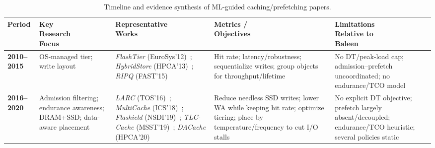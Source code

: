 \begin{table}[ht]
\begin{center}
\captionsetup{type=table}
\caption{Timeline and evidence synthesis of ML-guided caching/prefetching papers.}
\label{tab:bucketA-3periods-full}

\begingroup
\scriptsize
\setlength{\tabcolsep}{1.0pt}
\renewcommand{\arraystretch}{1.0}
\begin{tabularx}{\columnwidth}{
|>{\centering\arraybackslash}p{0.6cm}
|>{\centering\arraybackslash}p{1.5cm}
|>{\centering\arraybackslash}p{2.35cm}
|>{\centering\arraybackslash}p{2.0cm}
|>{\centering\arraybackslash}p{1.6cm}|}
\hline
\textbf{Period} &
\makecell{\textbf{Key}\\[-0pt]\textbf{Research}\\[-0pt]\textbf{Focus}} &
\makecell{\textbf{Representative}\\[-0pt]\textbf{Works}} &
\makecell{\textbf{Metrics /}\\[-0pt]\textbf{Objectives}} &
\makecell{\textbf{Limitations}\\\textbf{Relative to}\\\textbf{ Baleen}}
\\\hline

\textbf{2010--2015} &
OS-managed tier; write layout &
\textit{FlashTier} (EuroSys'12)~\cite{saxena2012flashtier}; 
\textit{HybridStore} (HPCA'13)~\cite{hybridstore2013}; 
\textit{RIPQ} (FAST'15)~\cite{tang2015ripq} &
Hit rate; latency/robustness; sequentialize writes; group objects for throughput/lifetime &
No DT/peak-load cap; admission–prefetch uncoordinated; no endurance/TCO model \\ \hline

\textbf{2016--2020} &
Admission filtering; endurance awareness; DRAM+SSD; data-aware placement &
\textit{LARC} (TOS'16)~\cite{huang2016larc}; 
\textit{MultiCache} (ICS'18)~\cite{bjorling2018multicache}; 
\textit{Flashield} (NSDI'19)~\cite{nsdi19-flashield}; 
\textit{TLC-Cache} (MSST'19)~\cite{zhong2019tlccache}; 
\textit{DACache} (HPCA'20)~\cite{li2020dacache} &
Reduce needless SSD writes; lower WA while keeping hit rate; optimize tiering; place by temperature/frequency to cut I/O stalls &
No explicit DT objective; prefetch largely absent/decoupled; endurance/TCO heuristic; several policies static \\ \hline


\end{tabularx}
\end{center}
\end{table}
